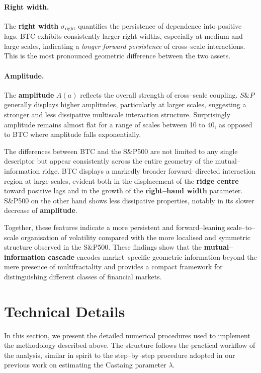 \documentclass[pdflatex,sn-mathphys-num]{sn-jnl}%
\theoremstyle{thmstyleone}%
\theoremstyle{thmstyletwo}%
\theoremstyle{thmstylethree}%
\begin{document}
\paragraph{Right width.}
The \textbf{right width} $\sigma_{\mathrm{right}}$ quantifies the persistence of
dependence into positive lags. BTC exhibits consistently larger right widths,
especially at medium and large scales, indicating a \emph{longer forward persistence}
of cross--scale interactions. This is the most pronounced geometric difference
between the two assets.

\paragraph{Amplitude.}
The \textbf{amplitude} $A(a)$ reflects the overall strength of
cross--scale coupling. $S\&P$ generally displays higher amplitudes, particularly at larger scales, suggesting a stronger and less dissipative multiscale interaction structure. Surprisingly amplitude remains almost flat for a range of scales between 10 to 40, as opposed to BTC where amplitude falls exponentially.


The differences between BTC and the S\&P500 are not limited to any single descriptor but appear consistently across the entire geometry of the mutual--information ridge.
BTC displays a markedly broader forward--directed interaction region at large scales, evident both in the displacement of the \textbf{ridge centre} toward positive lags and in the growth of the \textbf{right--hand width} parameter. S\&P500 on the other hand shows less dissipative properties, notably in its slower decrease of \textbf{amplitude}.

Together, these features indicate a more persistent and forward--leaning scale--to--scale organisation of volatility compared with the more localised and symmetric structure observed in the S\&P500. 
These findings show that the \textbf{mutual--information cascade}
encodes market--specific geometric information beyond the mere presence of multifractality and provides a compact framework for distinguishing different classes of financial markets.

\section{Technical Details}\label{sec:technical_details}

In this section, we present the detailed numerical procedures used to implement
the methodology described above. The structure follows the practical workflow
of the analysis, similar in spirit to the step–by–step procedure adopted in our
previous work on estimating the Castaing parameter $\lambda$.
\end{document}
